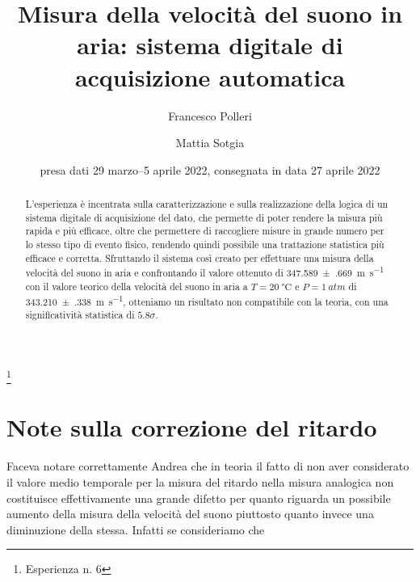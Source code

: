 \documentclass{memo}
\begin{document}
\title{
    Misura della velocità del suono in aria: sistema digitale di acquisizione automatica
}
\thanks{Esperienza n. 6
}

\author{Francesco Polleri}
\author{Mattia Sotgia}


\date{presa dati
    29 marzo--5 aprile 2022, consegnata in data
    27 aprile 2022
}
\revised{\today}

\begin{abstract}
    L'esperienza è incentrata sulla caratterizzazione e sulla realizzazione della logica di un sistema digitale di acquisizione del dato, che permette di poter rendere la misura più rapida e più efficace, oltre che permettere di raccogliere misure in grande numero per lo stesso tipo di evento fisico, rendendo quindi possibile una trattazione statistica più efficace e corretta. Sfruttando il sistema così creato per effettuare una misura della velocità del suono in aria e confrontando il valore ottenuto di \SI{347.589(669)}{\metre\per\second} con il valore teorico della velocità del suono in aria a $T=\SI{20}{\celsius}$ e $P=\SI{1}{atm}$ di \SI{343.210(338)}{\metre\per\second}, otteniamo un risultato non compatibile con la teoria, con una significatività statistica di $5.8\sigma$.
\end{abstract}

\maketitle


\section{Note sulla correzione del ritardo}

Faceva notare correttamente Andrea che in teoria il fatto di non aver considerato il valore medio temporale per la misura del ritardo nella misura analogica non costituisce effettivamente una grande difetto per quanto riguarda un possibile aumento della misura della velocità del suono piuttosto quanto invece una diminuzione della stessa. Infatti se consideriamo che 
\end{document}
